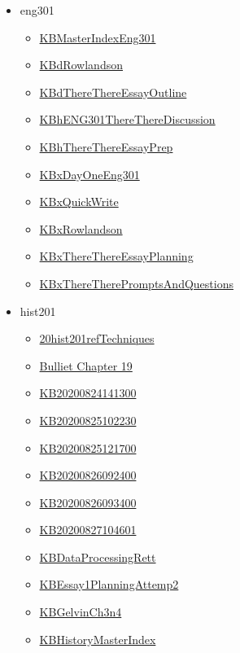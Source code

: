 \documentclass[11pt]{article}
\begin{document}
\begin{itemize}
\begin{itemize}
\end{itemize}
\item eng301
\begin{itemize}
\item \href{eng301/KBMasterIndexEng301.org}{KBMasterIndexEng301}
\item \href{eng301/KBdRowlandson.org}{KBdRowlandson}
\item \href{eng301/KBdThereThereEssayOutline.org}{KBdThereThereEssayOutline}
\item \href{eng301/KBhENG301ThereThereDiscussion.org}{KBhENG301ThereThereDiscussion}
\item \href{eng301/KBhThereThereEssayPrep.org}{KBhThereThereEssayPrep}
\item \href{eng301/KBxDayOneEng301.org}{KBxDayOneEng301}
\item \href{eng301/KBxQuickWrite.org}{KBxQuickWrite}
\item \href{eng301/KBxRowlandson.org}{KBxRowlandson}
\item \href{eng301/KBxThereThereEssayPlanning.org}{KBxThereThereEssayPlanning}
\item \href{eng301/KBxThereTherePromptsAndQuestions.org}{KBxThereTherePromptsAndQuestions}
\end{itemize}
\item hist201
\begin{itemize}
\item \href{hist201/20hist201refTechniques.org}{20hist201refTechniques}
\item \href{hist201/KBBullietCh19.org}{Bulliet Chapter 19}
\item \href{hist201/KB20200824141300.org}{KB20200824141300}
\item \href{hist201/KB20200825102230.org}{KB20200825102230}
\item \href{hist201/KB20200825121700.org}{KB20200825121700}
\item \href{hist201/KB20200826092400.org}{KB20200826092400}
\item \href{hist201/KB20200826093400.org}{KB20200826093400}
\item \href{hist201/KB20200827104601.org}{KB20200827104601}
\item \href{hist201/KBDataProcessingRett.org}{KBDataProcessingRett}
\item \href{hist201/KBEssay1PlanningAttemp2.org}{KBEssay1PlanningAttemp2}
\item \href{hist201/KBGelvinCh3n4.org}{KBGelvinCh3n4}
\item \href{hist201/KBHistoryMasterIndex.org}{KBHistoryMasterIndex}

\end{itemize}
\end{itemize}
\end{document}
